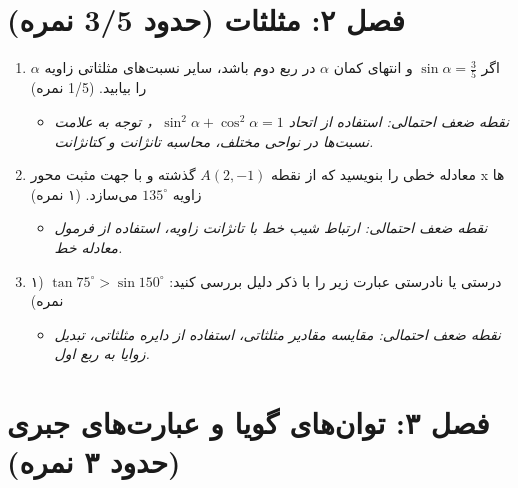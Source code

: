 \documentclass[12pt,a4paper]{article}
\begin{document}
\hrulefill
\vspace{1em}

\section*{\textbf{فصل ۲: مثلثات (حدود 3/5 نمره)}}

\begin{enumerate}[label=\arabic*., start=3, rightmargin=1em, itemsep=1em]
    \item اگر $\sin \alpha = \frac{3}{5}$ و انتهای کمان $\alpha$ در ربع دوم باشد، سایر نسبت‌های مثلثاتی زاویه $\alpha$ را بیابید. (1/5 نمره)
    \begin{itemize}[label=$\circ$, rightmargin=2em]
        \item \textit{نقطه ضعف احتمالی: استفاده از اتحاد $\sin^2 \alpha + \cos^2 \alpha = 1$， توجه به علامت نسبت‌ها در نواحی مختلف، محاسبه تانژانت و کتانژانت.}
    \end{itemize}

    \item معادله خطی را بنویسید که از نقطه $A(2, -1)$ گذشته و با جهت مثبت محور x ها زاویه $135^\circ$ می‌سازد. (۱ نمره)
    \begin{itemize}[label=$\circ$, rightmargin=2em]
        \item \textit{نقطه ضعف احتمالی: ارتباط شیب خط با تانژانت زاویه، استفاده از فرمول معادله خط.}
    \end{itemize}

    \item درستی یا نادرستی عبارت زیر را با ذکر دلیل بررسی کنید: $\tan 75^\circ > \sin 150^\circ$ (۱ نمره)
    \begin{itemize}[label=$\circ$, rightmargin=2em]
        \item \textit{نقطه ضعف احتمالی: مقایسه مقادیر مثلثاتی، استفاده از دایره مثلثاتی، تبدیل زوایا به ربع اول.}
    \end{itemize}
\end{enumerate}

\hrulefill
\vspace{1em}

\section*{\textbf{فصل ۳: توان‌های گویا و عبارت‌های جبری (حدود ۳ نمره)}}
\end{document}
